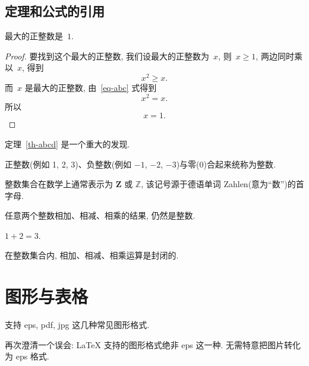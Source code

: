 \documentclass{WHUMaster}   %
\begin{document}
\subsection{定理和公式的引用}

\begin{theorem}[谁发现的]\label{th-abcd}
最大的正整数是~$1$.
\end{theorem}

\begin{proof}
要找到这个最大的正整数, 我们设最大的正整数为~$x$, 则~$x \geqslant 1$, 两边同时乘以~$x$, 得到
\begin{equation}\label{eq-abc}
x^2 \geqslant x.
\end{equation}
而~$x$ 是最大的正整数, 由~\eqref{eq-abc} 式得到
\[
x^2 = x.
\]
所以
\begin{equation*}
x = 1.
\end{equation*}
\end{proof}

定理~\ref{th-abcd} 是一个重大的发现.

\begin{definition}[整数]
 正整数(例如 1, 2, 3)、负整数(例如 ${−1}$, $−2$, $−3$)与零(0)合起来统称为{\heiti 整数}.
\end{definition}

\begin{remark}
  整数集合在数学上通常表示为 $\mathbf{Z}$ 或 $\mathbb{Z}$, 该记号源于德语单词 Zahlen(意为``数'')的首字母.
\end{remark}

\begin{proposition}
任意两个整数相加、相减、相乘的结果, 仍然是整数.
\end{proposition}

\begin{example}
  $1+2=3$.
\end{example}

\begin{corollary}
   在整数集合内, 相加、相减、相乘运算是封闭的.
\end{corollary}

\section{图形与表格}

支持 eps, pdf, jpg 这几种常见图形格式.

再次澄清一个误会: \LaTeX{} 支持的图形格式绝非 eps 这一种. 无需特意把图片转化为 eps 格式.
\end{document}
